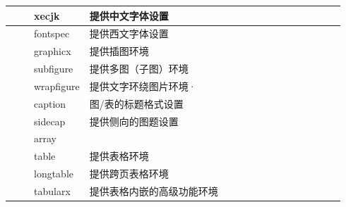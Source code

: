 \documentclass[12pt]{book}
\begin{document}
\begin{longtable}[htbp]
\begin{tabular}{|>{\centering\hspace{0pt}}m{0.075\linewidth}|>{\hspace{0pt}}m{0.084\linewidth}|>{\hspace{0pt}}m{0.779\linewidth}|}
		\hline
		\multirow{2}{0.075\linewidth}{\hspace{0pt}\centering{}字体}   & xecjk                                                               & 提供中文字体设置                                                                          \\ 
		\cline{2-3}
		& fontspec                                                            & 提供西文字体设置                                                                          \\ 
		\hline
		\multirow{5}{0.075\linewidth}{\hspace{0pt}\centering{}插图}   & graphicx                                                            & 提供插图环境                                                                            \\ 
		\cline{2-3}
		& subfigure                                                           & 提供多图（子图）环境                                                                        \\ 
		\cline{2-3}
		& wrapfigure                                                          & 提供文字环绕图片环境·                                                                       \\ 
		\cline{2-3}
		& caption                                                             & 图/表的标题格式设置                                                                        \\ 
		\cline{2-3}
		& sidecap                                                             & 提供侧向的图题设置                                                                         \\ 
		\hline
		\multirow{9}{0.075\linewidth}{\hspace{0pt}\centering{}表格}   & array                                                               &                                                                                   \\ 
		\cline{2-3}
		& table                                                               & 提供表格环境                                                                            \\ 
		\cline{2-3}
		& longtable                                                           & 提供跨页表格环境                                                                          \\ 
		\cline{2-3}
		& tabularx                                                            & 提供表格内嵌的高级功能环境                                                                     \\ 

\end{tabular}
\end{longtable}
\end{document}
